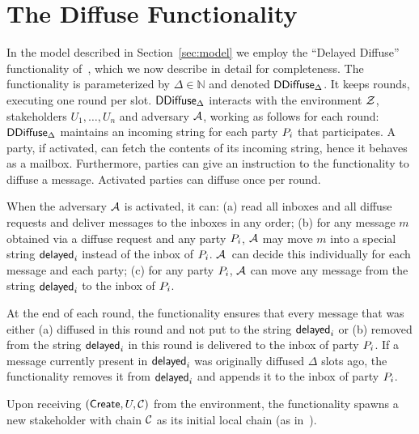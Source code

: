 \section{The Diffuse Functionality}
\label{diffuse}


In the model described in Section~\ref{sec:model} we employ the
``Delayed Diffuse'' functionality of~\cite{praos}, which we now describe
in detail for completeness.
The functionality is para\-meterized by $\Delta\in\mathbb{N}$ and
denoted {$\mathsf{DDiffuse}_\Delta$}. It keeps rounds, executing one round per slot.
{$\mathsf{DDiffuse}_\Delta$} interacts with the environment $\mathcal{Z}$, stakeholders
$U_1,\ldots,U_n$ and adversary $\mathcal{A}$,
working as follows for each
round:
  {$\mathsf{DDiffuse}_\Delta$} maintains an incoming string for each party $P_i$ that participates. A party,
if activated, can fetch the contents of its incoming
string, hence it behaves as a mailbox. Furthermore, parties can give
an instruction to the functionality to diffuse a message. Activated parties can diffuse once per round.

  When the adversary $\mathcal{A}$ is activated,
  it can:
    (a) read all
    inboxes and all diffuse requests and deliver messages to the inboxes in any
    order;
    (b) for any message $m$ obtained via a diffuse request and any party $P_i$,
      $\mathcal{A}$ may move $m$ into a special string $\mathsf{delayed}_i$ instead of the
      inbox of $P_i$. $\mathcal{A}$~can decide this individually for each message and
      each party;
    (c) for any party $P_i$, $\mathcal{A}$ can move any message from the string
      $\mathsf{delayed}_i$ to the inbox of $P_i$.

  At the end of each round, the functionality ensures that every message
  that was either (a) diffused in this round and not put to the string
  $\mathsf{delayed}_i$  or (b) removed from the string $\mathsf{delayed}_i$ in this round
  is delivered to the inbox of  party $P_i$.
  If a message currently present in $\mathsf{delayed}_i$ was
  originally diffused $\Delta$ slots ago, the functionality
  removes it from $\mathsf{delayed}_i$ and appends it to the inbox of party $P_i$.

    Upon receiving $(\mathsf{Create},U,\mathcal{C})$ from the environment, the
    functionality spawns a new stakeholder with chain $\mathcal{C}$ as its initial
    local chain (as in~\cite{ouroboros,praos}).
